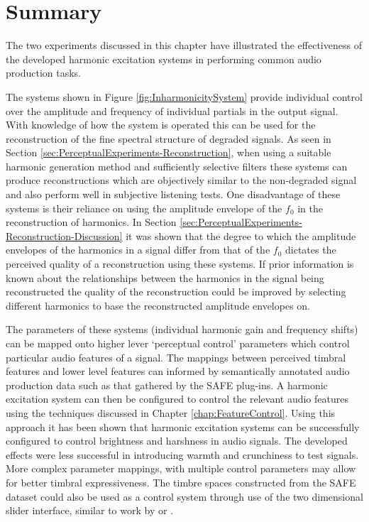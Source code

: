 \section{Summary}
\label{sec:PerceptualExperiments-Summary}
	The two experiments discussed in this chapter have illustrated the effectiveness of the developed harmonic
	excitation systems in performing common audio production tasks. 
	
	The systems shown in Figure \ref{fig:InharmonicitySystem} provide individual control over the amplitude and
	frequency of individual partials in the output signal. With knowledge of how the system is operated this can be
	used for the reconstruction of the fine spectral structure of degraded signals. As seen in Section
	\ref{sec:PerceptualExperiments-Reconstruction}, when using a suitable harmonic generation method and sufficiently
	selective filters these systems can produce reconstructions which are objectively similar to the non-degraded
	signal and also perform well in subjective listening tests. One disadvantage of these systems is their reliance on
	using the amplitude envelope of the $f_{0}$ in the reconstruction of harmonics. In Section
	\ref{sec:PerceptualExperiments-Reconstruction-Discussion} it was shown that the degree to which the amplitude
	envelopes of the harmonics in a signal differ from that of the $f_{0}$ dictates the perceived quality of a
	reconstruction using these systems. If prior information is known about the relationships between the harmonics in
	the signal being reconstructed the quality of the reconstruction could be improved by selecting different harmonics
	to base the reconstructed amplitude envelopes on.

	The parameters of these systems (individual harmonic gain and frequency shifts) can be mapped onto higher lever
	`perceptual control' parameters which control particular audio features of a signal. The mappings between perceived
	timbral features and lower level features can informed by semantically annotated audio production data such as that
	gathered by the SAFE plug-ins. A harmonic excitation system can then be configured to control the relevant audio
	features using the techniques discussed in Chapter \ref{chap:FeatureControl}. Using this approach it has been shown
	that harmonic excitation systems can be successfully configured to control brightness and harshness in audio
	signals. The developed effects were less successful in introducing warmth and crunchiness to test signals. More
	complex parameter mappings, with multiple control parameters may allow for better timbral expressiveness. The
	timbre spaces constructed from the SAFE dataset could also be used as a control system through use of the two
	dimensional slider interface, similar to work by \citet{schwarz2007corpus} or \citet{stasis2015a}.
